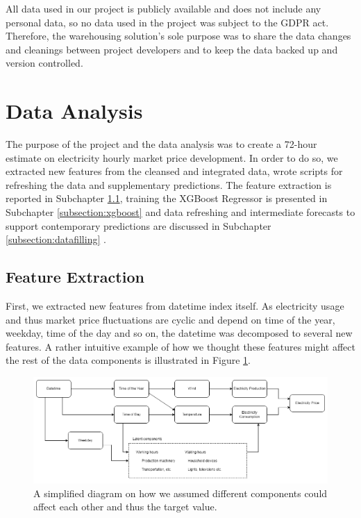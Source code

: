 \documentclass{article}
\begin{document}
All data used in our project is publicly available and does not include any personal data, so no data used in the project was subject to the GDPR act. Therefore, the warehousing solution's sole purpose was to share the data changes and cleanings between project developers and to keep the data backed up and version controlled.

\section{Data Analysis}
\label{section:analysis}

The purpose of the project and the data analysis was to create a 72-hour estimate on electricity hourly market price development. In order to do so, we extracted new features from the cleansed and integrated data, wrote scripts for refreshing the data and supplementary predictions. The feature extraction is reported in Subchapter \ref{subsection:extraction}, training the XGBoost Regressor is presented in Subchapter \ref{subsection:xgboost} and data refreshing and intermediate forecasts to support contemporary predictions are discussed in Subchapter \ref{subsection:datafilling} .

\subsection{Feature Extraction}
\label{subsection:extraction}


First, we extracted new features from datetime index itself. As electricity usage and thus market price fluctuations are cyclic and depend on time of the year, weekday, time of the day and so on, the datetime was decomposed to several new features. A rather intuitive example of how we thought these features might affect the rest of the data components is illustrated in Figure \ref{fig:components}.

\begin{figure}[ht] 
\centering
\includegraphics[width=\textwidth]{report/images/components.png}
\caption{A simplified diagram on how we assumed different components could affect each other and thus the target value.}
\label{fig:components} 
\end{figure}
\end{document}
